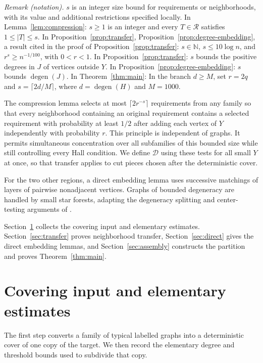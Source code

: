 \documentclass[11pt]{article}
\theoremstyle{remark}
\numberwithin{equation}{section}
\newcommand{\calD}{\mathcal D}
\newcommand{\calR}{\mathcal R}
\DeclareMathOperator{\degen}{degen}
\begin{document}
\noindent\textit{Remark (notation).} $s$ is an integer size bound for requirements or neighborhoods, with its value and additional restrictions specified locally. In Lemma~\ref{lem:compression}: $s\geq1$ is an integer and every $T\in\calR$ satisfies $1\leq|T|\leq s$. In Proposition~\ref{prop:transfer}, Proposition~\ref{prop:degree-embedding}, a result cited in the proof of Proposition~\ref{prop:transfer}: $s\in\mathbb N$, $s\leq10\log n$, and $r^s\geq n^{-1/100}$, with $0<r<1$. In Proposition~\ref{prop:transfer}: $s$ bounds the positive degrees in $J$ of vertices outside $Y$. In Proposition~\ref{prop:degree-embedding}: $s$ bounds $\degen(J)$. In Theorem~\ref{thm:main}: In the branch $d\geq M$, set $r=2q$ and $s=\lceil2d/M\rceil$, where $d=\degen(H)$ and $M=1000$.


The compression lemma selects at most $\lceil2r^{-s}\rceil$
requirements from any family so that every neighborhood containing
an original requirement contains a selected requirement with
probability at least $1/2$ after adding each vertex of $Y$
independently with probability $r$. This principle is independent
of graphs. It permits simultaneous concentration over all
subfamilies of this bounded size while still controlling every
Hall condition. We define $\calD$ using these tests for all small
$Y$ at once, so that transfer applies to cut pieces chosen after
the deterministic cover.

For the two other regions, a direct embedding lemma uses successive
matchings of layers of pairwise nonadjacent vertices. Graphs of
bounded degeneracy are handled by small star forests, adapting
the degeneracy splitting and center-testing arguments of
\cite[Claim~3.9 and Section~6]{AHPT26}.

Section~\ref{sec:prelim}
collects the covering input and elementary estimates.
Section~\ref{sec:transfer} proves neighborhood transfer,
Section~\ref{sec:direct} gives the direct embedding lemmas,
and Section~\ref{sec:assembly} constructs the partition and
proves Theorem~\ref{thm:main}.

\section{Covering input and elementary estimates}
\label{sec:prelim}

The first step converts a family of typical labelled graphs into
a deterministic cover of one copy of the target. We then record
the elementary degree and threshold bounds used to subdivide that
copy.
\end{document}

